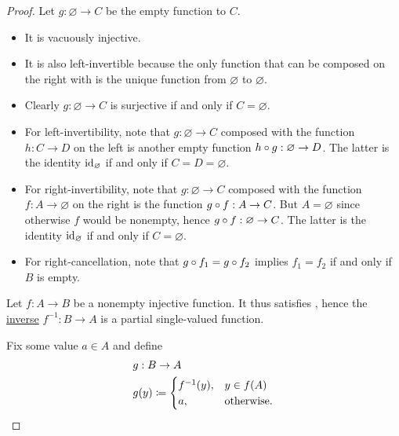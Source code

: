 \begin{proof}
   Let \( g: \varnothing \to C \) be the empty function to \( C \).

  \begin{itemize}
    \item It is vacuously injective.
    \item It is also left-invertible because the only function that can be composed on the right with is the unique function from \( \varnothing \) to \( \varnothing \).
    \item Clearly \( g: \varnothing \to C \) is surjective if and only if \( C = \varnothing \).
    \item For left-invertibility, note that \( g: \varnothing \to C \) composed with the function \( h: C \to D \) on the left is another empty function \( h \bincirc g: \varnothing \to D \). The latter is the identity \( \operatorname{id}_\varnothing \) if and only if \( C = D = \varnothing \).
    \item For right-invertibility, note that \( g: \varnothing \to C \) composed with the function \( f: A \to \varnothing \) on the right is the function \( g \bincirc f: A \to C \). But \( A = \varnothing \) since otherwise \( f \) would be nonempty, hence \( g \bincirc f: \varnothing \to C \). The latter is the identity \( \operatorname{id}_\varnothing \) if and only if \( C = \varnothing \).
    \item For right-cancellation, note that \( g \bincirc f_1 = g \bincirc f_2 \) implies \( f_1 = f_2 \) if and only if \( B \) is empty.
  \end{itemize}


  \SufficiencySubProof Let \( f: A \to B \) be a nonempty injective function. It thus satisfies , hence the \hyperref[def:set_valued_map/inverse]{inverse} \( f^{-1}: B \to A \) is a partial single-valued function.

  Fix some value \( a \in A \) and define
  \begin{equation*}
    \begin{aligned}
      &g: B \to A \\
      &g(y) \coloneqq \begin{cases}
        f^{-1}(y), &y \in f(A) \\
        a,         &\T{otherwise.}
      \end{cases}
    \end{aligned}
  \end{equation*}


\end{proof}
